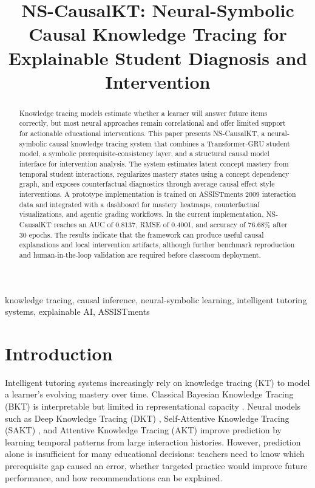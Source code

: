 \documentclass[conference]{IEEEtran}
\title{NS-CausalKT: Neural-Symbolic Causal Knowledge Tracing for Explainable Student Diagnosis and Intervention}
\author{
\IEEEauthorblockN{Aditya Ranjan}
\IEEEauthorblockA{
NS-CausalKT Agentic Grader Project\\
India\\
Email: author@example.com}
}
\begin{document}
\maketitle

\begin{abstract}
Knowledge tracing models estimate whether a learner will answer future items correctly, but most neural approaches remain correlational and offer limited support for actionable educational interventions. This paper presents NS-CausalKT, a neural-symbolic causal knowledge tracing system that combines a Transformer-GRU student model, a symbolic prerequisite-consistency layer, and a structural causal model interface for intervention analysis. The system estimates latent concept mastery from temporal student interactions, regularizes mastery states using a concept dependency graph, and exposes counterfactual diagnostics through average causal effect style interventions. A prototype implementation is trained on ASSISTments 2009 interaction data and integrated with a dashboard for mastery heatmaps, counterfactual visualizations, and agentic grading workflows. In the current implementation, NS-CausalKT reaches an AUC of 0.8137, RMSE of 0.4001, and accuracy of 76.68\% after 30 epochs. The results indicate that the framework can produce useful causal explanations and local intervention artifacts, although further benchmark reproduction and human-in-the-loop validation are required before classroom deployment.
\end{abstract}

\begin{IEEEkeywords}
knowledge tracing, causal inference, neural-symbolic learning, intelligent tutoring systems, explainable AI, ASSISTments
\end{IEEEkeywords}

\section{Introduction}
Intelligent tutoring systems increasingly rely on knowledge tracing (KT) to model a learner's evolving mastery over time. Classical Bayesian Knowledge Tracing (BKT) is interpretable but limited in representational capacity \cite{corbett1994knowledge}. Neural models such as Deep Knowledge Tracing (DKT) \cite{piech2015deep}, Self-Attentive Knowledge Tracing (SAKT) \cite{pandey2019self}, and Attentive Knowledge Tracing (AKT) \cite{ghosh2020context} improve prediction by learning temporal patterns from large interaction histories. However, prediction alone is insufficient for many educational decisions: teachers need to know which prerequisite gap caused an error, whether targeted practice would improve future performance, and how recommendations can be explained.
\end{document}

